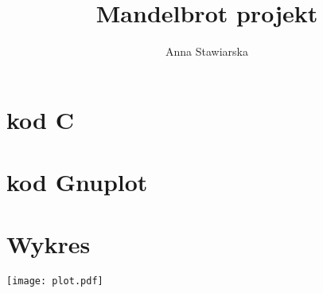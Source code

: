 \documentclass{article}
\begin{document}
 \title{Mandelbrot projekt}
 \author{Anna Stawiarska}
 \maketitle
 
 \tableofcontents
 \newpage
 
 \section{kod C}
 
 
 \section{kod Gnuplot}
 
 
 \section{Wykres}
 \texttt{[image: plot.pdf]}
\end{document}
